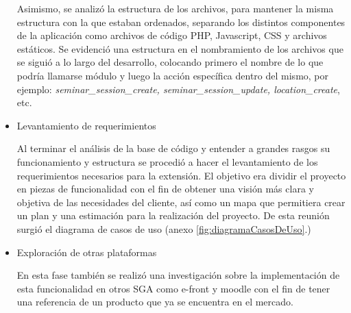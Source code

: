 \begin{itemize}
Asimismo, se analizó la estructura de los archivos, para mantener la misma estructura con la que estaban ordenados, separando los distintos componentes de la aplicación como archivos de código PHP, Javascript, \gls{CSS} y archivos estáticos. Se evidenció una estructura en el nombramiento de los archivos que se siguió a lo largo del desarrollo, colocando primero el nombre de lo que podría llamarse módulo y luego la acción específica dentro del mismo, por ejemplo: \emph{seminar\_session\_create, seminar\_session\_update, location\_create}, etc.

\item Levantamiento de requerimientos

Al terminar el análisis de la base de código y entender a grandes rasgos su funcionamiento y estructura se procedió a hacer el levantamiento de los requerimientos necesarios para la extensión. El objetivo era dividir el proyecto en piezas de funcionalidad con el fin de obtener una visión más clara y objetiva de las necesidades del cliente, así como un mapa que permitiera crear un plan y una estimación para la realización del proyecto. De esta reunión surgió el diagrama de casos de uso (anexo \ref{fig:diagramaCasosDeUso}.)

\item Exploración de otras plataformas

En esta fase también se realizó una investigación sobre la implementación de esta funcionalidad en otros SGA como e-front y moodle con el fin de tener una referencia de un producto que ya se encuentra en el mercado.

\end{itemize}






